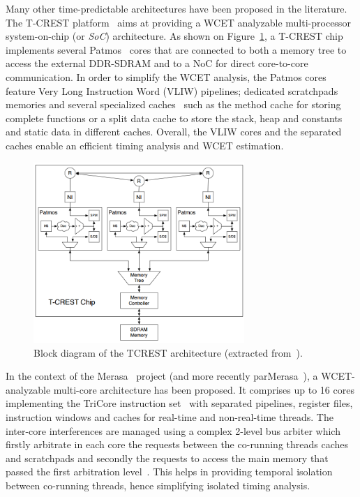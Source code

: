 \documentclass[main.tex]{subfiles}
\begin{document}
Many other time-predictable architectures have been proposed in the literature.
The T-CREST platform~\cite{tcrest2015} aims at providing a WCET analyzable
multi-processor system-on-chip (or \emph{SoC}) architecture. As shown on
Figure~\ref{fig_stateOfTheArt_TCRESTarchi}, a T-CREST chip implements several
Patmos~\cite{patmos2011} cores that are connected to both a memory tree to
access the external DDR-SDRAM and to a NoC for direct core-to-core
communication. In order to simplify the WCET analysis, the Patmos cores feature
Very Long Instruction Word (VLIW) pipelines; dedicated scratchpads memories and
several specialized caches~\cite{Schoeberl2009} such as the method cache for
storing complete functions or a split data cache to store the stack, heap and
constants and static data in different caches. Overall, the VLIW cores and the
separated caches enable an efficient timing analysis and WCET estimation.\\

\begin{figure}
    \centering
    \includegraphics[width=8cm]{imgs/png/stateOfTheArt_TCRESTarchi.png}
    \caption{Block diagram of the TCREST architecture (extracted
    from~\cite{tcrest2015}).}
    \label{fig_stateOfTheArt_TCRESTarchi}
\end{figure}


In the context of the Merasa~\cite{Merasa} project (and more recently
parMerasa~\cite{parMerasa}), a WCET-analyzable multi-core architecture has been
proposed. It comprises up to 16 cores implementing the TriCore instruction
set~\cite{TriCore} with separated pipelines, register files, instruction
windows and caches for real-time and non-real-time threads. The inter-core
interferences are managed using a complex 2-level bus arbiter which firstly
arbitrate in each core the requests between the co-running threads caches and
scratchpads and secondly the requests to access the main memory that passed the
first arbitration level~\cite{Paolieri2009_SIGARCH}. This helps in providing
temporal isolation between co-running threads, hence simplifying isolated
timing analysis. \\
\end{document}
